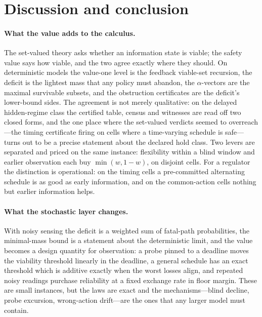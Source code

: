 \section{Discussion and conclusion}\label{sec:discussion}

\paragraph{What the value adds to the calculus.}
The set-valued theory asks whether an information state is viable; the safety value says how viable, and the two agree exactly where they should. On deterministic models the value-one level is the feedback viable-set recursion, the deficit is the lightest mass that any policy must abandon, the $\alpha$-vectors are the maximal survivable subsets, and the obstruction certificates are the deficit's lower-bound sides. The agreement is not merely qualitative: on the delayed hidden-regime class the certified table, census and witnesses are read off two closed forms, and the one place where the set-valued verdicts seemed to overreach---the timing certificate firing on cells where a time-varying schedule is safe---turns out to be a precise statement about the declared hold class. Two levers are separated and priced on the same instance: flexibility within a blind window and earlier observation each buy $\min(w,1-w)$, on disjoint cells. For a regulator the distinction is operational: on the timing cells a pre-committed alternating schedule is as good as early information, and on the common-action cells nothing but earlier information helps.

\paragraph{What the stochastic layer changes.}
With noisy sensing the deficit is a weighted sum of fatal-path probabilities, the minimal-mass bound is a statement about the deterministic limit, and the value becomes a design quantity for observation: a probe pinned to a deadline moves the viability threshold linearly in the deadline, a general schedule has an exact threshold which is additive exactly when the worst losses align, and repeated noisy readings purchase reliability at a fixed exchange rate in floor margin. These are small instances, but the laws are exact and the mechanisms---blind decline, probe excursion, wrong-action drift---are the ones that any larger model must contain.

